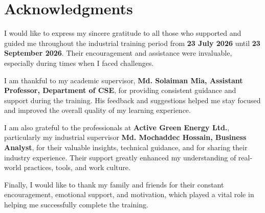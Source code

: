 
\chapter*{\centering Acknowledgments}

I would like to express my sincere gratitude to all those who supported and guided me throughout the industrial training period from \textbf{23 July 2026} until \textbf{23 September 2026}. Their encouragement and assistance were invaluable, especially during times when I faced challenges.

I am thankful to my academic supervisor, \textbf{Md. Solaiman Mia, Assistant Professor, Department of CSE}, for providing consistent guidance and support during the training. His feedback and suggestions helped me stay focused and improved the overall quality of my learning experience.

I am also grateful to the professionals at \textbf{Active Green Energy Ltd.}, particularly my industrial supervisor \textbf{Md. Mochaddec Hossain, Business Analyst}, for their valuable insights, technical guidance, and for sharing their industry experience. Their support greatly enhanced my understanding of real-world practices, tools, and work culture.

Finally, I would like to thank my family and friends for their constant encouragement, emotional support, and motivation, which played a vital role in helping me successfully complete the training.

